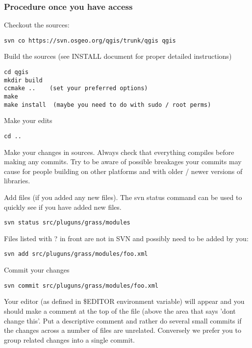 \subsubsection{Procedure once you have access}
Checkout the sources:

\begin{verbatim}
svn co https://svn.osgeo.org/qgis/trunk/qgis qgis
\end{verbatim}

Build the sources (see INSTALL document for proper detailed instructions)

\begin{verbatim}
cd qgis
mkdir build
ccmake ..    (set your preferred options)
make
make install  (maybe you need to do with sudo / root perms)
\end{verbatim}

Make your edits

\begin{verbatim}
cd ..
\end{verbatim}

Make your changes in sources. Always check that everything compiles before making any commits.
Try to be aware of possible breakages your commits may cause for people building on other 
platforms and with older / newer versions of libraries.

Add files (if you added any new files). The svn status command can be used to quickly see 
if you have added new files.

\begin{verbatim}
svn status src/pluguns/grass/modules
\end{verbatim}

Files listed with ? in front are not in SVN and possibly need to be added by you:

\begin{verbatim}
svn add src/pluguns/grass/modules/foo.xml
\end{verbatim}

Commit your changes

\begin{verbatim}
svn commit src/pluguns/grass/modules/foo.xml
\end{verbatim}

Your editor (as defined in \$EDITOR environment variable) will appear and you should make a
 comment at the top of the file (above the area that says 'dont change this'. Put a 
descriptive comment and rather do several small commits if the changes across a number of 
files are unrelated. Conversely we prefer you to group related changes into a single commit.

